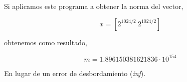 

	
\begin{paracol}{2}
Si aplicamos este programa a obtener la norma del vector,
\end{paracol}
\begin{equation*}
x=[2^{1024/2}\ 2^{1024/2}]
\end{equation*}
\begin{paracol}{2}
obtenemos como resultado,
\end{paracol}
\begin{equation*}
m=1.896150381621836\cdot10^{154}
\end{equation*}
\begin{paracol}{2}
En lugar de un error de desbordamiento (\emph{inf}).
\end{paracol}


  	 